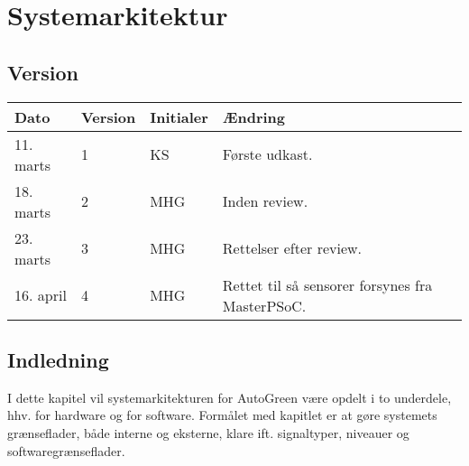 \chapter{Systemarkitektur} \label{ch:SysArk}

\section{Version}
\begin{table}[h]
	\centering
	\begin{tabularx}{\textwidth - 2cm}{|l|l|l|X|}
	\hline
	Dato	& Version	& Initialer & Ændring	\\ \hline
	11. marts & 1 & KS & Første udkast. \\ \hline
	18. marts & 2 & MHG & Inden review. \\\hline
	23. marts & 3 & MHG & Rettelser efter review. \\\hline		
	16. april & 4 & MHG & Rettet til så \IIC sensorer forsynes fra MasterPSoC. \\\hline 
	\end{tabularx}
\end{table}

\section{Indledning}

I dette kapitel vil systemarkitekturen for AutoGreen være opdelt i to underdele, hhv. for hardware og for software. Formålet med kapitlet er at gøre systemets grænseflader, både interne og eksterne, klare ift. signaltyper, niveauer og softwaregrænseflader.







